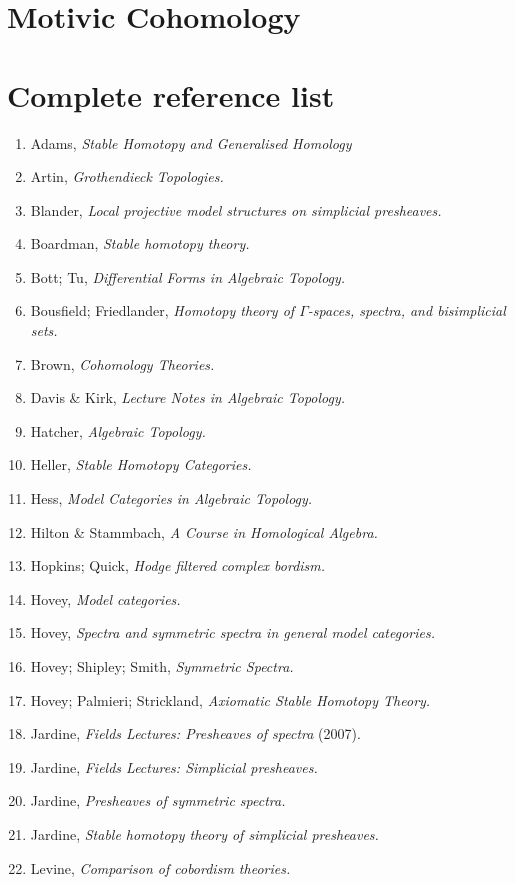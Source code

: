 \documentclass{article}%
\begin{document}
\section{Motivic Cohomology}


\section{Complete reference list}
\begin{enumerate}
\item Adams, {\it Stable Homotopy and Generalised Homology}
\item Artin, {\it Grothendieck Topologies.}
\item Blander, {\it Local projective model structures on simplicial presheaves.}
\item Boardman, {\it Stable homotopy theory.}
\item Bott; Tu, {\it Differential Forms in Algebraic Topology.}
\item Bousfield; Friedlander, {\it Homotopy theory of $\Gamma$-spaces, spectra, and bisimplicial sets.}
\item Brown, {\it Cohomology Theories.} 
\item Davis \& Kirk, {\it Lecture Notes in Algebraic Topology.}
\item Hatcher, {\it Algebraic Topology.}
\item Heller, {\it Stable Homotopy Categories.}
\item Hess, {\it Model Categories in Algebraic Topology.}
\item Hilton \& Stammbach, {\it A Course in Homological Algebra.}
\item Hopkins; Quick, {\it Hodge filtered complex bordism.}
\item Hovey, {\it Model categories.}
\item Hovey, {\it Spectra and symmetric spectra in general model categories.}
\item Hovey; Shipley; Smith, {\it Symmetric Spectra.}
\item Hovey; Palmieri; Strickland, {\it Axiomatic Stable Homotopy Theory.}
\item Jardine, {\it Fields Lectures: Presheaves of spectra} (2007).
\item Jardine, {\it Fields Lectures: Simplicial presheaves.}
\item Jardine, {\it Presheaves of symmetric spectra.}
\item Jardine, {\it Stable homotopy theory of simplicial presheaves.}
\item Levine, {\it Comparison of cobordism theories.}

\end{enumerate}
\end{document}
